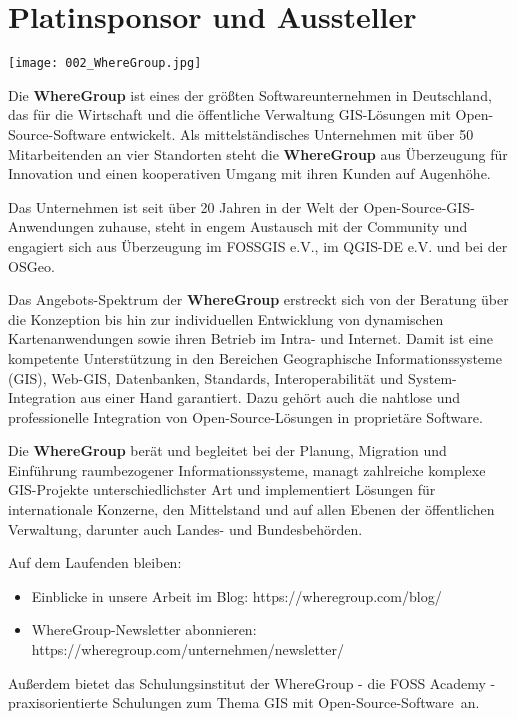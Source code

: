 \section*{Platinsponsor und Aussteller}
\begin{center}
  \centerline{\texttt{[image: 002\_WhereGroup.jpg]}}
\end{center}
\vspace*{-0.4cm}

\noindent
Die {\bfseries WhereGroup} ist eines der größten Softwareunternehmen in Deutschland, das für die Wirtschaft und die öffentliche Verwaltung GIS-Lösungen mit Open-Source-Software entwickelt. Als mittelständisches Unternehmen mit über 50 Mitarbeitenden an vier Standorten steht die {\bfseries WhereGroup} aus Überzeugung für Innovation und einen kooperativen Umgang mit ihren Kunden auf Augenhöhe.

\noindent
Das Unternehmen ist seit über 20 Jahren in der Welt der Open-Source-GIS-Anwendungen zuhause, steht in engem Austausch mit der Community und engagiert sich aus Überzeugung im FOSSGIS e.V., im QGIS-DE e.V. und bei der OSGeo.

\noindent
Das Angebots-Spektrum der {\bfseries WhereGroup} erstreckt sich von der Beratung über die Konzeption bis hin zur individuellen Entwicklung von dynamischen Kartenanwendungen sowie ihren Betrieb im Intra- und Internet. Damit ist eine kompetente Unterstützung in den Bereichen Geographische Informationssysteme (GIS), Web-GIS, Datenbanken, Standards, Interoperabilität und System-Integration aus einer Hand garantiert. Dazu gehört auch die nahtlose und professionelle Integration von Open-Source-Lösungen in proprietäre Software.

\noindent
Die {\bfseries WhereGroup} berät und begleitet bei der Planung, Migration und Einführung raumbezogener Informationssysteme, managt zahlreiche komplexe GIS-Projekte unterschiedlichster Art und implementiert Lösungen für internationale Konzerne, den Mittelstand und auf allen Ebenen der öffentlichen Verwaltung, darunter auch Landes- und Bundesbehörden.

\noindent
Auf dem Laufenden bleiben:
\begin{itemize}
\item Einblicke in unsere Arbeit im Blog: https://wheregroup.com/blog/    
\item WhereGroup-Newsletter abonnieren: https://wheregroup.com/unternehmen/newsletter/
\end{itemize}

\noindent
Außerdem bietet das Schulungsinstitut der WhereGroup - die FOSS Academy - praxisorientierte Schulungen zum Thema \glqq GIS mit Open-Source-Software\grqq\  an.

